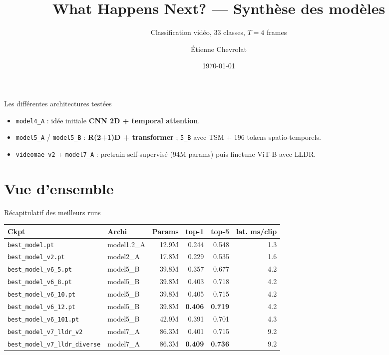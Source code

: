 \documentclass[10pt,aspectratio=169]{beamer}
\title[What Happens Next?]{What Happens Next? --- Synthèse des modèles}
\subtitle{Classification vidéo, 33 classes, $T=4$ frames}
\author{Étienne Chevrolat}
\institute{CSC\_43M04\_EP}
\date{\today}
\newcommand{\good}[1]{\textcolor{good}{\textbf{#1}}}
\begin{document}
\maketitle

\begin{frame}{Les différentes architectures testées}
  \medskip
  \begin{itemize}
    \item \texttt{model4\_A} : idée initiale \textbf{CNN 2D + temporal attention}.
    \item \texttt{model5\_A} / \texttt{model5\_B} : \textbf{R(2+1)D + transformer} ; \texttt{5\_B} avec TSM + 196 tokens spatio-temporels.
    \item \texttt{videomae\_v2} + \texttt{model7\_A} : pretrain self-supervisé (94M params) puis finetune ViT-B avec LLDR.
  \end{itemize}
\end{frame}

\section{Vue d'ensemble}

\begin{frame}{Récapitulatif des meilleurs runs}
  \footnotesize
  \begin{tabular}{l l r r r r}
    \toprule
    \textbf{Ckpt} & \textbf{Archi} & \textbf{Params} & \textbf{top-1} & \textbf{top-5} & \textbf{lat. ms/clip} \\
    \midrule
    \texttt{best\_model.pt}              & model1.2\_A          & 12.9M & 0.244 & 0.548 & 1.3 \\
    \texttt{best\_model\_v2.pt}          & model2\_A            & 17.8M & 0.229 & 0.535 & 1.6 \\
    \texttt{best\_model\_v6\_5.pt}       & model5\_B            & 39.8M & 0.357 & 0.677 & 4.2 \\
    \texttt{best\_model\_v6\_8.pt}       & model5\_B            & 39.8M & 0.403 & 0.718 & 4.2 \\
    \texttt{best\_model\_v6\_10.pt}      & model5\_B            & 39.8M & 0.405 & 0.715 & 4.2 \\
    \alert{\texttt{best\_model\_v6\_12.pt}} & \alert{model5\_B} & \alert{39.8M} & \alert{\good{0.406}} & \alert{\good{0.719}} & 4.2 \\
    \texttt{best\_model\_v6\_101.pt}     & model5\_B            & 42.9M & 0.391 & 0.701 & 4.3 \\
    \texttt{best\_model\_v7\_lldr\_v2}   & model7\_A            & 86.3M & 0.401 & 0.715 & 9.2 \\
    \alert{\texttt{best\_model\_v7\_lldr\_diverse}} & \alert{model7\_A} & \alert{86.3M} & \alert{\good{0.409}} & \alert{\good{0.736}} & \alert{9.2} \\
    \bottomrule
  \end{tabular}
\end{frame}
\end{document}
